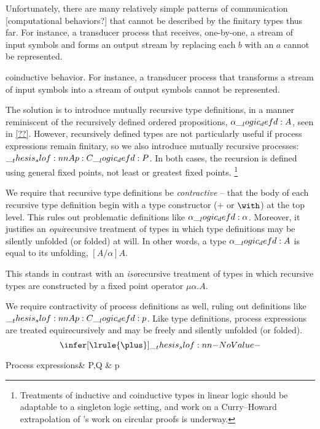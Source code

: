 Unfortunately, there are many relatively simple patterns of communication [computational behaviors?] that cannot be described by the finitary types thus far.
For instance, a transducer process that receives, one-by-one, a stream of input symbols and forms an output stream by replacing each $b$ with an $a$ cannot be represented.

coinductive behavior.
For instance, a transducer process that transforms a stream of input symbols into a stream of output symbols cannot be represented.

The solution is to introduce mutually recursive type definitions, in a manner reminiscent of the recursively defined ordered propositions, $\alpha \__logic_defd: A$, seen in \cref{??}.
However, recursively defined types are not particularly useful if process expressions remain finitary, so we also introduce mutually recursive processes: $\slof{A |- p : C} \defd P$.
In both cases, the recursion is defined using general fixed points, not least or greatest fixed points.%
\footnote{Treatments of inductive and coinductive types in linear logic\autocite{Baelde:?,Toninho+:TGC14} should be adaptable to a singleton logic setting, and work on a Curry--Howard extrapolation of \citeauthor{Fortier-Santocanale:CSL?}'s work on circular proofs\autocite{Fortier-Santocanale:CSL?} is underway.}


We require that recursive type definitions be \emph{contractive}\autocite{??} -- that the body of each recursive type definition begin with a type constructor ($\plus$ or $\with$) at the top level.
This rules out problematic definitions like $\alpha \__logic_defd: \alpha$.
Moreover, it justifies an \emph{equi}\-recursive treatment of types in which type definitions may be silently unfolded (or folded) at will.
In other words, a type $\alpha \__logic_defd: A$ is equal to its unfolding, $[A/\alpha]A$.

This stands in contrast with an \emph{iso}\-recursive treatment of types in which recursive types are constructed by a fixed point operator $\mu \alpha.A$.


We require contractivity of process definitions as well, ruling out definitions like $\slof{A |- p : C} \defd p$.
Like type definitions, process expressions are treated equi\-recursively and may be freely and silently unfolded (or folded).
\begin{equation*}
  \infer[\lrule{\plus}]{\slof{}}{}
\end{equation*}

\begin{syntax*}
  Process expressions&
    P,Q & \dotsb \mid p
\end{syntax*}



